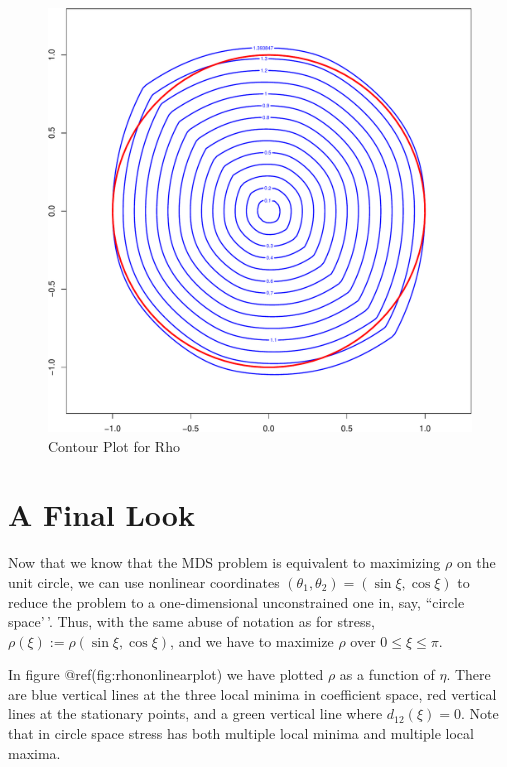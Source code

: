 \documentclass[
  12pt,
  letterpaper,
  DIV=11,
  numbers=noendperiod]{scrreprt}
\theoremstyle{remark}
\begin{document}
\begin{figure}[H]

{\centering \includegraphics{spaces_files/figure-pdf/rhocontour-1.pdf}

}

\caption{Contour Plot for Rho}

\end{figure}%

\section{A Final Look}\label{picline}

Now that we know that the MDS problem is equivalent to maximizing
\(\rho\) on the unit circle, we can use nonlinear coordinates
\((\theta_1,\theta_2)=(\sin\xi,\cos\xi)\) to reduce the problem to a
one-dimensional unconstrained one in, say, ``circle space'\,'. Thus,
with the same abuse of notation as for stress,
\(\rho(\xi):=\rho(\sin\xi,\cos\xi)\), and we have to maximize \(\rho\)
over \(0\leq\xi\leq\pi\).

In figure @ref(fig:rhononlinearplot) we have plotted \(\rho\) as a
function of \(\eta\). There are blue vertical lines at the three local
minima in coefficient space, red vertical lines at the stationary
points, and a green vertical line where \(d_{12}(\xi)=0\). Note that in
circle space stress has both multiple local minima and multiple local
maxima.
\end{document}
